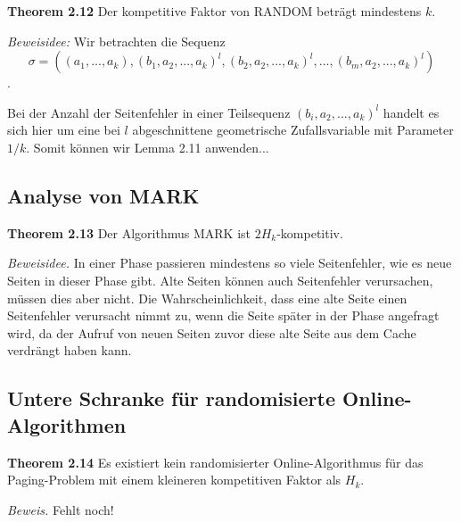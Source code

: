 \textbf{Theorem 2.12} Der kompetitive Faktor von RANDOM beträgt mindestens $k$.

\textit{Beweisidee:} Wir betrachten die Sequenz $$\sigma = \left((a_1,...,a_k),(b_1,a_2,...,a_k)^l,(b_2,a_2,...,a_k)^l,...,(b_m,a_2,...,a_k)^l\right)$$.

Bei der Anzahl der Seitenfehler in einer Teilsequenz $(b_i,a_2,...,a_k)^l$ handelt es sich hier um eine bei $l$ abgeschnittene geometrische Zufallsvariable mit Parameter $1/k$. Somit können wir Lemma 2.11 anwenden...


\subsection{Analyse von MARK}

\textbf{Theorem 2.13} Der Algorithmus MARK ist $2H_k$-kompetitiv.

\textit{Beweisidee.} In einer Phase passieren mindestens so viele Seitenfehler, wie es neue Seiten in dieser Phase gibt. Alte Seiten können auch Seitenfehler verursachen, müssen dies aber nicht. Die Wahrscheinlichkeit, dass eine alte Seite einen Seitenfehler verursacht nimmt zu, wenn die Seite später in der Phase angefragt wird, da der Aufruf von neuen Seiten zuvor diese alte Seite aus dem Cache verdrängt haben kann.

\subsection{Untere Schranke für randomisierte Online-Algorithmen}

\textbf{Theorem 2.14} Es existiert kein randomisierter Online-Algorithmus für das Paging-Problem mit einem kleineren kompetitiven Faktor als $H_k$.

\textit{Beweis.} Fehlt noch!

